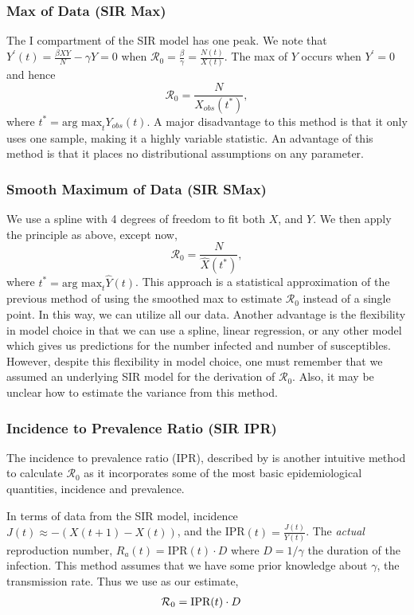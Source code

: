 \documentclass[12pt]{article}
\newcommand{\rr}{\ensuremath{\mathcal{R}_0}}
\begin{document}
\subsubsection{Max of Data (SIR Max)}\label{max-of-data}
The I compartment of the SIR model has one peak.    We note that \(Y^\prime(t) = \frac{\beta XY}{N} - \gamma Y = 0\) when \(\rr = \frac{\beta}{\gamma} = \frac{N(t)}{X(t)}\). The max
of \(Y\) occurs when \(Y^\prime = 0\) and hence
\[\rr = \frac{N}{X_{obs}(t^*)},\] where
\(t^* = \text{arg max}_{t} Y_{obs}(t)\).   A major disadvantage to this method is that it only uses one sample, making it a highly variable statistic.  An advantage of this method is that it places no distributional assumptions on any parameter.

\subsubsection{Smooth Maximum of Data (SIR SMax)}\label{smooth-maximum-of-data}

We use a spline with 4 degrees of freedom to fit both \(X\), and \(Y\).
We then apply the principle as above, except now,
\[\rr = \frac{N}{\hat{X}(t^*)},\] where
\(t^* = \text{arg max}_{t} \hat{Y}(t)\).   This approach is a statistical approximation of the previous method of using the smoothed max to estimate $\rr$ instead of a single point.  In this way, we can utilize all our data.  Another advantage is the flexibility in model choice in that we can use a spline, linear regression, or any other model which gives us predictions for the number infected and number of susceptibles.  However, despite this flexibility in model choice, one must remember that we assumed an underlying SIR model for the derivation of $\rr$.  Also, it may be unclear how to estimate the variance from this method.

\subsubsection{Incidence to Prevalence
  Ratio (SIR IPR)}\label{incidence-to-prevalence-ratio}
The incidence to prevalence ratio (IPR), described by \cite{Nishiura2009} is another intuitive method to calculate $\rr$ as it incorporates some of the most basic epidemiological quantities, incidence and prevalence.

In terms of data from the SIR model, incidence $J(t) \approx -(X(t+1) - X(t))$, and the IPR$(t) = \frac{J(t)}{Y(t)}$. The \textit{actual} reproduction number, $R_a(t) = \text{IPR}(t)\cdot D$ where $D = 1 /\gamma$ the duration of the infection.  This method assumes that we have some prior knowledge about $\gamma$, the transmission rate.  Thus we use as our estimate,
\begin{align*}
\rr &= \textnormal{IPR}(t) \cdot D
\end{align*}
\end{document}
